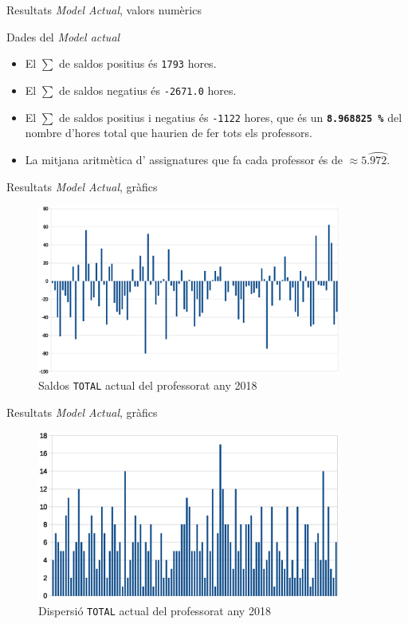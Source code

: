 \documentclass[twocolumn]{beamer}
\begin{document}
\begin{frame}{Resultats \textit{Model Actual}, valors numèrics }

\begin{block}{Dades del \textit{Model actual}}
	\begin{itemize}
		\item El $\sum$ de saldos positius és \texttt{1793} hores.	
		\item El $\sum$ de saldos negatius és \texttt{-2671.0} hores.	
		\item El $\sum$ de saldos positius i negatius  és \texttt{-1122} hores, que és un \texttt{\textbf{8.968825 \%}} del nombre d'hores total que haurien de fer tots els professors.
		\item La mitjana aritmètica d' assignatures que fa cada professor és de  $\approx 5. \wideparen{972}$. 
	\end{itemize}
\end{block}
\end{frame}





\begin{frame}{Resultats \textit{Model Actual}, gràfics}
\begin{figure}
	\includegraphics[width=10cm]{saldo_actual}
	\caption{Saldos \texttt{TOTAL} actual del professorat any 2018}
\end{figure}
\end{frame}


\begin{frame}{Resultats \textit{Model Actual}, gràfics}
\begin{figure}
	\includegraphics[width=10cm]{dispersio_actual}
	\caption{Dispersió \texttt{TOTAL} actual del professorat any 2018}
\end{figure}
\end{frame}
\end{document}
